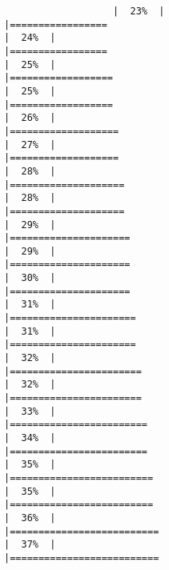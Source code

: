 \documentclass[
]{article}
\begin{document}
\begin{verbatim}
                   |  23%  |                                                                              |=================                                                     |  24%  |                                                                              |=================                                                     |  25%  |                                                                              |==================                                                    |  25%  |                                                                              |==================                                                    |  26%  |                                                                              |===================                                                   |  27%  |                                                                              |===================                                                   |  28%  |                                                                              |====================                                                  |  28%  |                                                                              |====================                                                  |  29%  |                                                                              |=====================                                                 |  29%  |                                                                              |=====================                                                 |  30%  |                                                                              |=====================                                                 |  31%  |                                                                              |======================                                                |  31%  |                                                                              |======================                                                |  32%  |                                                                              |=======================                                               |  32%  |                                                                              |=======================                                               |  33%  |                                                                              |========================                                              |  34%  |                                                                              |========================                                              |  35%  |                                                                              |=========================                                             |  35%  |                                                                              |=========================                                             |  36%  |                                                                              |==========================                                            |  37%  |                                                                              |==========================                          
\end{verbatim}
\end{document}
